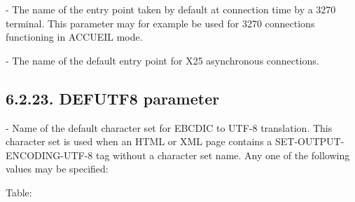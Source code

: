 \documentclass[letterpaper,10pt,english]{sphinxmanual}
\begin{document}
 - The name of the entry point taken by default at connection time by a 3270 terminal. This parameter may for example be used for 3270 connections functioning in ACCUEIL mode.

 - The name of the default entry point for X25 asynchronous connections.


\subsection{6.2.23. DEFUTF8 parameter}
\label{\detokenize{Installation_Guide:defutf8-parameter}}
\begin{sphinxVerbatim}[commandchars=\\\{\}]
 
\end{sphinxVerbatim}

 - Name of the default character set for EBCDIC to UTF-8 translation. This character set is used when an HTML or XML page contains a SET-OUTPUT-ENCODING-UTF-8 tag without a character set name. Any one of the following values may be specified:

Table:
\end{document}
